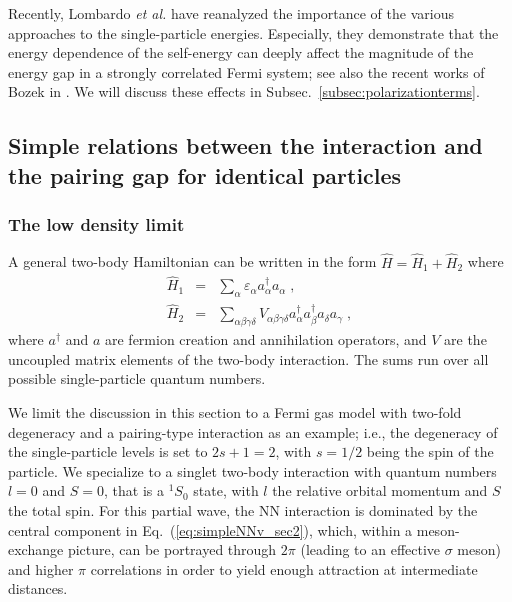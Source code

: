 \documentclass[rmp,aps,floatfix]{revtex4}
\begin{document}
Recently,  Lombardo {\em et al.}  \cite{lsz2001,ls2000} have reanalyzed the importance 
of the various approaches to the single-particle energies. Especially, 
they demonstrate that 
the energy dependence
of the self-energy can deeply affect the magnitude of the energy gap in a 
strongly correlated Fermi system; see also the recent works of Bozek in
\cite{bozek1999,bozek2000,bozek2002}. 
We will discuss these effects in Subsec.~\ref{subsec:polarizationterms}.



\subsection{Simple relations between the interaction and the pairing gap for identical particles}
\label{subsec:NN_to_pairing_sec1}

\subsubsection{The low density limit} 


A general two-body Hamiltonian 
can be written in the form $\hat{H}=\hat{H}_1+\hat{H}_2$ where
\begin{eqnarray}
\hat{H}_1&=&\sum_\alpha \varepsilon_\alpha a^\dagger_\alpha a_{\alpha} \;, \\
\hat{H}_2&=&\sum_{\alpha\beta\gamma\delta}V_{\alpha\beta\gamma\delta}
a^\dagger_\alpha a^\dagger_\beta a_\delta a_\gamma \;,
\label{eq:hamiltonian_sec1}
\end{eqnarray}
where $a^\dagger$ and $a$ are fermion creation and annihilation operators,
and $V$ are the uncoupled matrix elements of the two-body interaction. 
The sums run over all possible single-particle quantum numbers.

We limit the discussion in this section to 
a Fermi gas model with two-fold degeneracy and 
a pairing-type interaction as an example; i.e., 
the degeneracy of the 
single-particle levels is set to $2s+1=2$, with $s=1/2$ being the 
spin of the particle. 
We specialize to 
a singlet two-body interaction with quantum numbers $l=0$ and
$S=0$, that is a $^1S_0$ state, with $l$ the relative orbital
momentum and $S$ the total spin. 
For this partial wave, the NN interaction is dominated by the
central component in Eq.~(\ref{eq:simpleNNv_sec2}), 
which, within a meson-exchange picture, can be portrayed
through $2\pi$ (leading to an effective $\sigma$ meson) 
and higher $\pi$ correlations in order to yield enough
attraction at intermediate distances.
\end{document}
